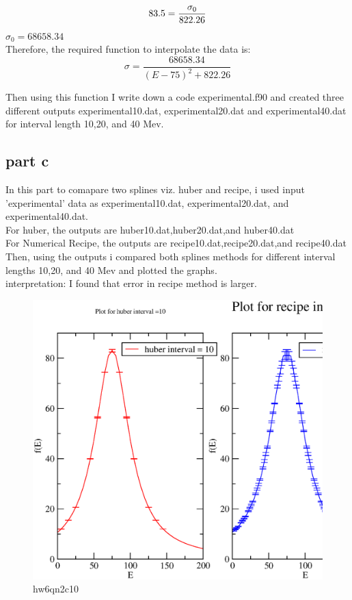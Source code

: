 \documentclass[11pt,a4paper,english]{article}
\newcommand{\bdm}{\begin{displaymath}}
\newcommand{\edm}{\end{displaymath}}
\begin{document}
\bdm
83.5 = \frac{\sigma_{0}}{822.26}\\
\edm
$\sigma_{0}=68658.34$\\
Therefore, the required function to interpolate the data is:\\

\bdm
\sigma = \frac{68658.34}{(E-75)^{2}+822.26}
\edm

Then using this function I write down a code experimental.f90 and
created three different outputs experimental10.dat, experimental20.dat and experimental40.dat for interval length 10,20, and 40 Mev.

	
	\subsection{part c}
In this part to comapare two splines viz. huber and recipe, i used input 'experimental' data as experimental10.dat, experimental20.dat, and experimental40.dat.\\
For huber, the outputs are huber10.dat,huber20.dat,and huber40.dat\\
For Numerical Recipe, the outputs are recipe10.dat,recipe20.dat,and recipe40.dat\\
Then, using the outputs i compared both splines methods for different interval lengths 10,20, and 40 Mev and plotted the graphs.\\
interpretation: I found that error in recipe method is larger.\\
	\begin{figure}[h!]
	\centering
	\includegraphics [scale=0.6]{hw6qn2c10.eps}
	\caption{hw6qn2c10 }
	\end{figure}
\end{document}
